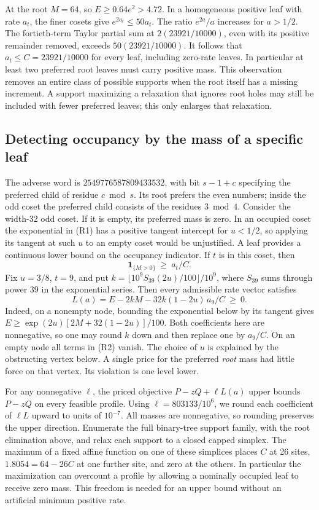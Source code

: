 \documentclass[12pt,letterpaper]{article}
\begin{document}
At the root \(M=64\), so \(E\ge0.64e^2>4.72\). In a homogeneous positive leaf with rate \(a_t\), the finer cosets give \(e^{2a_t}\le50a_t\). The ratio \(e^{2a}/a\) increases for \(a>1/2\). The fortieth-term Taylor partial sum at \(2(23921/10000)\), even with its positive remainder removed, exceeds \(50(23921/10000)\). It follows that \(a_t\le C=23921/10000\) for every leaf, including zero-rate leaves. In particular at least two preferred root leaves must carry positive mass. This observation removes an entire class of possible supports when the root itself has a missing increment. A support maximizing a relaxation that ignores root holes may still be included with fewer preferred leaves; this only enlarges that relaxation.

\subsection{Detecting occupancy by the mass of a specific leaf}

The adverse word is \(2549776587809433532\), with bit \(s-1+c\) specifying the preferred child of residue \(c\bmod s\). Its root prefers the even numbers; inside the odd coset the preferred child consists of the residues \(3\bmod4\). Consider the width-32 odd coset. If it is empty, its preferred mass is zero. In an occupied coset the exponential in (R1) has a positive tangent intercept for \(u<1/2\), so applying its tangent at such \(u\) to an empty coset would be unjustified. A leaf provides a continuous lower bound on the occupancy indicator. If \(t\) is in this coset, then
\[
 \mathbf1_{\{M>0\}}\ \ge\ a_t/C.
\]
Fix \(u=3/8\), \(t=9\), and put \(k=\lfloor 10^9 S_{39}(2u)/100\rfloor/10^9\), where \(S_{39}\) sums through power 39 in the exponential series. Then every admissible rate vector satisfies
\[
 L(a)= E-2kM-32k(1-2u)\,a_9/C\ \ge\ 0.
 \tag{R2}
\]
Indeed, on a nonempty node, bounding the exponential below by its tangent gives \(E\ge \exp(2u)[2M+32(1-2u)]/100\). Both coefficients here are nonnegative, so one may round \(k\) down and then replace one by \(a_9/C\). On an empty node all terms in (R2) vanish. The choice of \(u\) is explained by the obstructing vertex below. A single price for the preferred \emph{root} mass had little force on that vertex. Its violation is one level lower.

For any nonnegative \(\ell\), the priced objective \(P-zQ+\ell L(a)\) upper bounds \(P-zQ\) on every feasible profile. Using \(\ell=803133/10^6\), we round each coefficient of \(\ell L\) upward to units of \(10^{-7}\). All masses are nonnegative, so rounding preserves the upper direction. Enumerate the full binary-tree support family, with the root elimination above, and relax each support to a closed capped simplex. The maximum of a fixed affine function on one of these simplices places \(C\) at 26 sites, \(1.8054=64-26C\) at one further site, and zero at the others. In particular the maximization can overcount a profile by allowing a nominally occupied leaf to receive zero mass. This freedom is needed for an upper bound without an artificial minimum positive rate.
\end{document}
